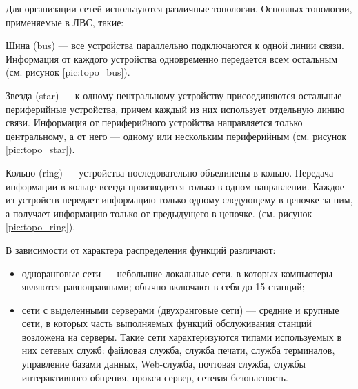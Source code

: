 Для организации сетей используются различные топологии. Основных топологии, применяемые
в ЛВС, такие: 

Шина (bus) — все устройства параллельно подключаются к одной линии связи. Информация
от каждого устройства одновременно передается всем остальным
(см. рисунок \ref{pic:topo_bus}).

Звезда (star) — к одному центральному устройству присоединяются остальные периферийные
устройства, причем каждый из них использует отдельную линию связи. Информация
от периферийного устройства направляется только центральному, а от него —
одному или нескольким периферийным
(см. рисунок \ref{pic:topo_star}).

Кольцо (ring) — устройства последовательно объединены в кольцо. Передача информации
в кольце всегда производится только в одном направлении. Каждое из устройств
передает информацию только одному следующему в цепочке за ним, а
получает информацию только от предыдущего в цепочке.
(см. рисунок \ref{pic:topo_ring}).

В зависимости от характера распределения функций различают: 

\begin{itemize}
    \item одноранговые  сети — небольшие  локальные  сети,  в которых компьютеры являются
        равноправными; обычно включают в себя до 15 станций;

    \item сети с выделенными серверами (двухранговые сети) — средние и крупные сети, в
        которых часть выполняемых функций обслуживания станций возложена на серверы. Такие
        сети характеризуются типами  используемых в них сетевых служб: файловая служба,
        служба печати, служба терминалов, управление базами данных, Web-служба, почтовая
        служба, службы интерактивного общения, прокси-сервер, сетевая безопасность.
\end{itemize}

